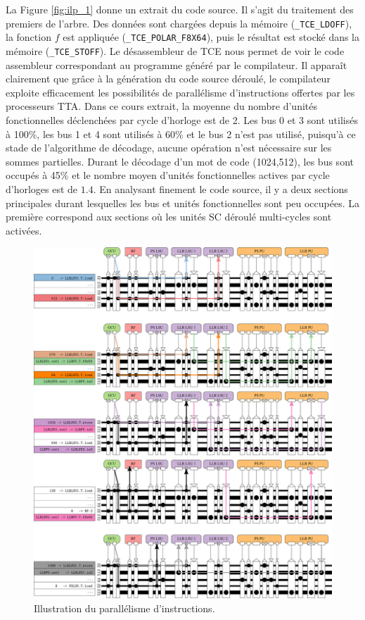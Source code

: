 La Figure \ref{fig:ilp_1} donne un extrait du code source. Il s'agit du traitement des premiers \noeuds de l'arbre. Des données sont chargées depuis la mémoire (\texttt{\_TCE\_LDOFF}), la fonction $f$ est appliquée (\texttt{\_TCE\_POLAR\_F8X64}), puis le résultat est stocké dans la mémoire (\texttt{\_TCE\_STOFF}). Le désassembleur de TCE nous permet de voir le code assembleur correspondant au programme généré par le compilateur. Il apparaît clairement que grâce à la génération du code source déroulé, le compilateur exploite efficacement les possibilités de parallélisme d'instructions offertes par les processeurs TTA. Dans ce cours extrait, la moyenne du nombre d'unités fonctionnelles déclenchées par cycle d'horloge est de 2. Les bus 0 et 3 sont utilisés à 100\%, les bus 1 et 4 sont utilisés à 60\% et le bus 2 n'est pas utilisé, puisqu'à ce stade de l'algorithme de décodage, aucune opération n'est nécessaire sur les sommes partielles. Durant le décodage d'un mot de code (1024,512), les bus sont occupés à 45\% et le nombre moyen d'unités fonctionnelles actives par cycle d'horloges est de $1.4$. En analysant finement le code source, il y a deux sections principales durant lesquelles les bus et unités fonctionnelles sont peu occupées. La première correspond aux sections où les unités \og SC déroulé \fg multi-cycles sont activées. 
\begin{figure}[htp]
\centering
\includegraphics[width=\textwidth]{main/ch4_fig/ilp_2}
\caption{Illustration du parallélisme d'instructions.}
\label{fig:ilp_2}
\end{figure}
